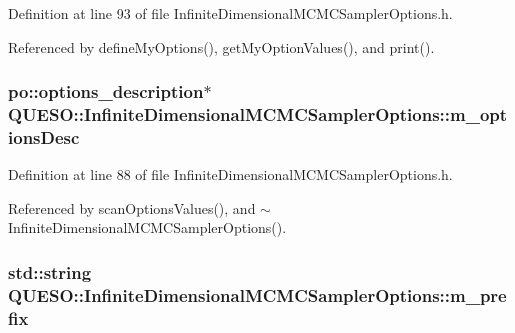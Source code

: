 Definition at line 93 of file Infinite\-Dimensional\-M\-C\-M\-C\-Sampler\-Options.\-h.



Referenced by define\-My\-Options(), get\-My\-Option\-Values(), and print().

\hypertarget{class_q_u_e_s_o_1_1_infinite_dimensional_m_c_m_c_sampler_options_af3c175cdb1ed25be98ccee045b011b1f}{
\subsubsection[{m\-\_\-options\-Desc}]{\setlength{\rightskip}{0pt plus 5cm}po\-::options\-\_\-description$\ast$ Q\-U\-E\-S\-O\-::\-Infinite\-Dimensional\-M\-C\-M\-C\-Sampler\-Options\-::m\-\_\-options\-Desc\hspace{0.3cm}{\ttfamily [private]}}}\label{class_q_u_e_s_o_1_1_infinite_dimensional_m_c_m_c_sampler_options_af3c175cdb1ed25be98ccee045b011b1f}


Definition at line 88 of file Infinite\-Dimensional\-M\-C\-M\-C\-Sampler\-Options.\-h.



Referenced by scan\-Options\-Values(), and $\sim$\-Infinite\-Dimensional\-M\-C\-M\-C\-Sampler\-Options().

\hypertarget{class_q_u_e_s_o_1_1_infinite_dimensional_m_c_m_c_sampler_options_a6cb95c7e8adbc6ead99b2cf3fb3aed56}{
\subsubsection[{m\-\_\-prefix}]{\setlength{\rightskip}{0pt plus 5cm}std\-::string Q\-U\-E\-S\-O\-::\-Infinite\-Dimensional\-M\-C\-M\-C\-Sampler\-Options\-::m\-\_\-prefix}}\label{class_q_u_e_s_o_1_1_infinite_dimensional_m_c_m_c_sampler_options_a6cb95c7e8adbc6ead99b2cf3fb3aed56}


